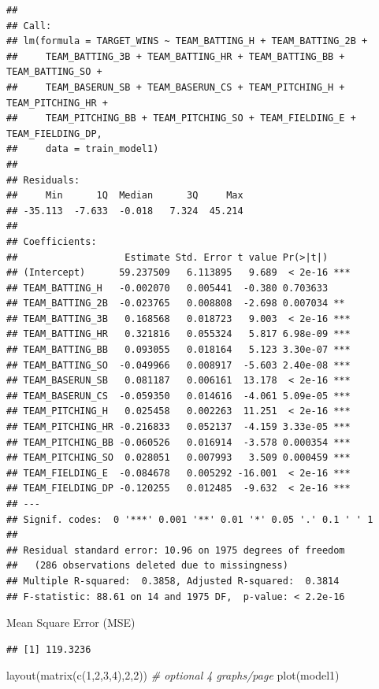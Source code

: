 \documentclass[
]{article}
\newenvironment{Shaded}{\begin{snugshade}}{\end{snugshade}}
\newcommand{\CommentTok}[1]{\textcolor[rgb]{0.56,0.35,0.01}{\textit{#1}}}
\newcommand{\DecValTok}[1]{\textcolor[rgb]{0.00,0.00,0.81}{#1}}
\newcommand{\FunctionTok}[1]{\textcolor[rgb]{0.00,0.00,0.00}{#1}}
\newcommand{\NormalTok}[1]{#1}
\newcommand{\SpecialCharTok}[1]{\textcolor[rgb]{0.00,0.00,0.00}{#1}}
\begin{document}
\begin{verbatim}
## 
## Call:
## lm(formula = TARGET_WINS ~ TEAM_BATTING_H + TEAM_BATTING_2B + 
##     TEAM_BATTING_3B + TEAM_BATTING_HR + TEAM_BATTING_BB + TEAM_BATTING_SO + 
##     TEAM_BASERUN_SB + TEAM_BASERUN_CS + TEAM_PITCHING_H + TEAM_PITCHING_HR + 
##     TEAM_PITCHING_BB + TEAM_PITCHING_SO + TEAM_FIELDING_E + TEAM_FIELDING_DP, 
##     data = train_model1)
## 
## Residuals:
##     Min      1Q  Median      3Q     Max 
## -35.113  -7.633  -0.018   7.324  45.214 
## 
## Coefficients:
##                   Estimate Std. Error t value Pr(>|t|)    
## (Intercept)      59.237509   6.113895   9.689  < 2e-16 ***
## TEAM_BATTING_H   -0.002070   0.005441  -0.380 0.703633    
## TEAM_BATTING_2B  -0.023765   0.008808  -2.698 0.007034 ** 
## TEAM_BATTING_3B   0.168568   0.018723   9.003  < 2e-16 ***
## TEAM_BATTING_HR   0.321816   0.055324   5.817 6.98e-09 ***
## TEAM_BATTING_BB   0.093055   0.018164   5.123 3.30e-07 ***
## TEAM_BATTING_SO  -0.049966   0.008917  -5.603 2.40e-08 ***
## TEAM_BASERUN_SB   0.081187   0.006161  13.178  < 2e-16 ***
## TEAM_BASERUN_CS  -0.059350   0.014616  -4.061 5.09e-05 ***
## TEAM_PITCHING_H   0.025458   0.002263  11.251  < 2e-16 ***
## TEAM_PITCHING_HR -0.216833   0.052137  -4.159 3.33e-05 ***
## TEAM_PITCHING_BB -0.060526   0.016914  -3.578 0.000354 ***
## TEAM_PITCHING_SO  0.028051   0.007993   3.509 0.000459 ***
## TEAM_FIELDING_E  -0.084678   0.005292 -16.001  < 2e-16 ***
## TEAM_FIELDING_DP -0.120255   0.012485  -9.632  < 2e-16 ***
## ---
## Signif. codes:  0 '***' 0.001 '**' 0.01 '*' 0.05 '.' 0.1 ' ' 1
## 
## Residual standard error: 10.96 on 1975 degrees of freedom
##   (286 observations deleted due to missingness)
## Multiple R-squared:  0.3858, Adjusted R-squared:  0.3814 
## F-statistic: 88.61 on 14 and 1975 DF,  p-value: < 2.2e-16
\end{verbatim}

Mean Square Error (MSE)

\begin{Shaded}
\end{Shaded}

\begin{verbatim}
## [1] 119.3236
\end{verbatim}

\begin{Shaded}
\begin{Highlighting}[]
\FunctionTok{layout}\NormalTok{(}\FunctionTok{matrix}\NormalTok{(}\FunctionTok{c}\NormalTok{(}\DecValTok{1}\NormalTok{,}\DecValTok{2}\NormalTok{,}\DecValTok{3}\NormalTok{,}\DecValTok{4}\NormalTok{),}\DecValTok{2}\NormalTok{,}\DecValTok{2}\NormalTok{)) }\CommentTok{\# optional 4 graphs/page}
\FunctionTok{plot}\NormalTok{(model1)}
\end{Highlighting}
\end{Shaded}
\end{document}

